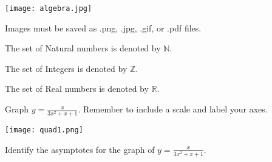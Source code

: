 \documentclass[11pt]{article}
\def\eq1{y=\frac{x}{3x^2+x+1}}
\def\labelaxes{Remember to include a scale and label your axes.}
\begin{document}
\begin{center}
\texttt{[image: algebra.jpg]}

Images must be saved as .png, .jpg, .gif, or .pdf files.
\end{center}

The set of Natural numbers is denoted by $\mathbb{N}$.

The set of Integers is denoted by $\mathbb{Z}$.

The set of Real numbers is denoted by $\mathbb{R}$.

Graph $\eq1$. \labelaxes

\texttt{[image: quad1.png]}

Identify the asymptotes for the graph of $\eq1$.
\end{document}
